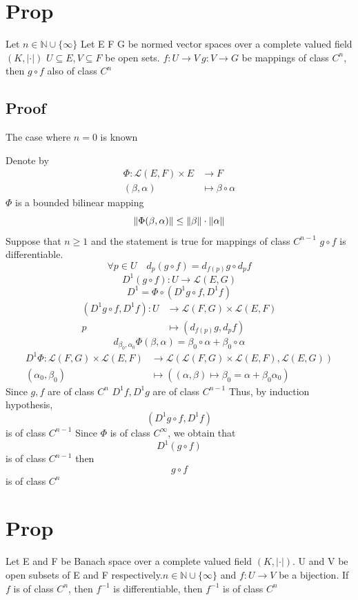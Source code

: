 \documentclass{book}
\newcommand{\abs}[1]{\left\lvert #1 \right\rvert}
\begin{document}
\section{Prop}
Let $n\in \mathbb{N}\cup\{\infty\}$ Let E F G be normed vector spaces over a complete valued field $(K,\abs\cdot)$ $U\subseteq E,V\subseteq F$ be open sets. $f:U\rightarrow V\ g: V\rightarrow G$ be mappings of class $C^n$, then $g\circ f$ also of class $C^n$
\subsection{Proof}
The case where $n=0$ is known

Denote by $$\begin{aligned}
    \Phi: \mathscr{L}(E,F)\times E &\rightarrow F\\ (\beta,\alpha) &\mapsto \beta\circ\alpha
\end{aligned}$$
$\Phi$ is a bounded bilinear mapping $$\left\lVert \Phi(\beta,\alpha) \right\rVert\leq\left\lVert \beta \right\rVert\cdot\left\lVert \alpha \right\rVert$$
Suppose that $n\geq 1$ and the statement is true for mappings of class $C^{n-1}$ $g\circ f$ is differentiable.$$\forall p\in U\quad d_p(g\circ f)=d_{f(p)}g\circ d_pf$$
$$D^1(g\circ f):U\rightarrow\mathscr{L}(E,G)$$
$$D^1=\Phi\circ(D^1g\circ f,D^1 f)$$
$$
\begin{aligned}
    (D^1g\circ f,D^1f): U &\rightarrow \mathscr{L}(F,G)\times\mathscr{L}(E,F)\\
    p &\mapsto(d_{f(p)}g,d_pf)
\end{aligned}$$
$$d_{\beta_0,\alpha_0}\Phi(\beta,\alpha)=\beta_0\circ\alpha+\beta_0\circ\alpha$$
$$
\begin{aligned}
    D^1\Phi:\mathscr{L}(F,G)\times\mathscr{L}(E,F)&\rightarrow\mathscr{L}(\mathscr{L}(F,G)\times\mathscr{L}(E,F),\mathscr{L}(E,G))\\
    (\alpha_0,\beta_0)&\mapsto((\alpha,\beta)\mapsto\beta_0=\alpha+\beta_0\alpha_0)
\end{aligned}
$$
Since $g,f$ are of class $C^n$ $D^1f,D^1g$ are of class $C^{n-1}$ Thus, by induction hypothesis, $$(D^1g\circ f,D^1f)$$ is of class $C^{n-1}$
Since $\Phi$ is of class $C^\infty$, we obtain that $$D^1(g\circ f)$$ is of class $C^{n-1}$
then $$g\circ f$$ is of class $C^n$
\section{Prop}
Let E and F be Banach space over a complete valued field $(K,\abs\cdot).$ U and V be open subsets of E and F respectively.$n\in \mathbb{N}\cup\{\infty\}$ and $f:U\rightarrow V$ be a  bijection. If $f$ is of class $C^n$, then $f^{-1}$ is differentiable, then $f^{-1}$ is of class $C^n$
\end{document}
